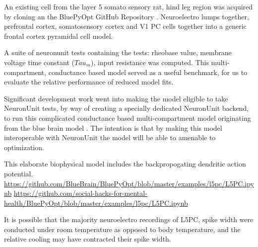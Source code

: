 An existing cell from the layer 5 somato sensory rat, hind leg region was acquired by cloning an the BluePyOpt GitHub Repository \cite{van2016bluepyopt}
. Neuroelectro lumps together, prefrontal cortex, somatosensory cortex and V1 PC cells together into a generic frontal cortex pyramidal cell model. 


%
A suite of neuronunit tests containing the tests: rheobase value, membrane voltage time constant ($Tau_{m}$), input resistance was computed. This multi-compartment, conductance based model served as a useful benchmark, for us to evaluate the relative performance of reduced model fits. 



Significant development work went into making the model eligible to take NeuronUnit tests, by way of creating a specially dedicated NeuronUnit backend, to run this complicated conductance based multi-compartment model originating from the blue brain model \cite{markram2015reconstruction}. The intention is that by making this model interoperable with NeuronUnit the model will be able to amenable to optimization.


This elaborate biophysical model includes the backpropogating dendritic action potential.
\url{https://github.com/BlueBrain/BluePyOpt/blob/master/examples/l5pc/L5PC.ipynb}
\url{https://github.com/social-hacks-for-mental-health/BluePyOpt/blob/master/examples/l5pc/L5PC.ipynb}


It is possible that the majority neuroelectro recordings of L5PC, spike width were conducted under room temperature as opposed to body temperature, and the relative cooling may have contracted their spike width.
\cite{goldin2017temperature}

